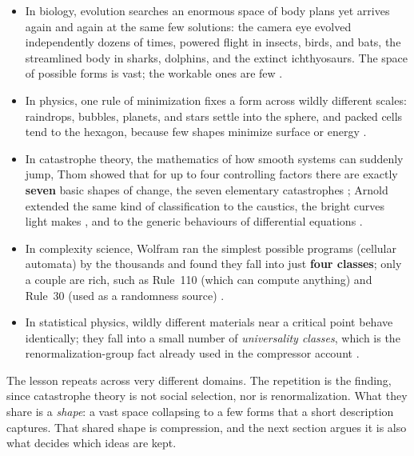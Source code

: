 \documentclass[11pt]{article}
\begin{document}
\begin{itemize}
\item In biology, evolution searches an enormous space of body plans yet arrives again and again at
the same few solutions: the camera eye evolved independently dozens of times, powered flight in
insects, birds, and bats, the streamlined body in sharks, dolphins, and the extinct ichthyosaurs.
The space of possible forms is vast; the workable ones are few \cite{conwaymorris2003}.
\item In physics, one rule of minimization fixes a form across wildly different scales: raindrops,
bubbles, planets, and stars settle into the sphere, and packed cells tend to the hexagon, because few
shapes minimize surface or energy \cite{thompson1917}.
\item In catastrophe theory, the mathematics of how smooth systems can suddenly jump, Thom showed that for up to four
controlling factors there are exactly \textbf{seven} basic shapes of change, the seven elementary
catastrophes \cite{thom1975}; Arnold extended the same kind of classification to the caustics, the
bright curves light makes \cite{arnold1984}, and to the generic behaviours of differential equations
\cite{arnold_ode}.
\item In complexity science, Wolfram ran the simplest possible programs (cellular automata) by the thousands and found they
fall into just \textbf{four classes}; only a couple are rich, such as Rule~110 (which can
compute anything) and Rule~30 (used as a randomness source) \cite{wolfram2002}.
\item In statistical physics, wildly different materials near a critical point behave identically; they fall into
a small number of \emph{universality classes}, which is the renormalization-group fact already used
in the compressor account \cite{gavrilov_compressors}.
\end{itemize}

The lesson repeats across very different domains. The repetition is the finding, since catastrophe
theory is not social selection, nor is renormalization. What they share is a \emph{shape}: a vast
space collapsing to a few forms that a short description captures. That shared shape is compression,
and the next section argues it is also what decides which ideas are kept.
\end{document}
